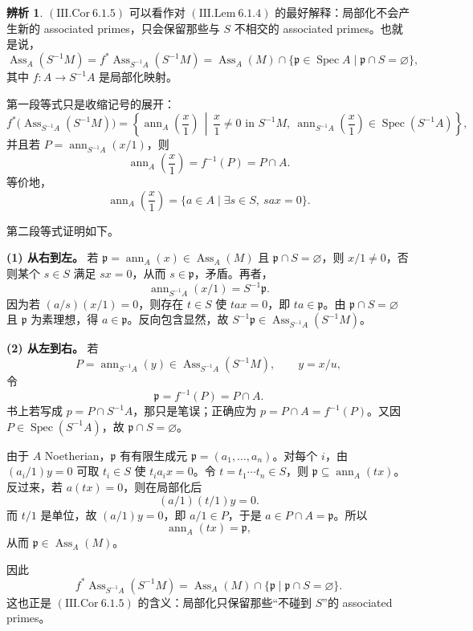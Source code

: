 \documentclass[a4paper]{ctexart}
\theoremstyle{definition}
\theoremstyle{analysis}
\newtheorem{remark}{辨析}[section]
\theoremstyle{plain}
\begin{document}
\begin{remark}
\label{rem:ass-localization-formula}
\((\mathrm{III.Cor}\ 6.1.5)\) 可以看作对 \((\mathrm{III.Lem}\ 6.1.4)\) 的最好解释：局部化不会产生新的 associated primes，只会保留那些与 \(S\) 不相交的 associated primes。也就是说，
\[
  \operatorname{Ass}_A(S^{-1}M)
  =
  f^*\operatorname{Ass}_{S^{-1}A}(S^{-1}M)
  =
  \operatorname{Ass}_A(M)\cap\{\mathfrak p\in \operatorname{Spec}A\mid \mathfrak p\cap S=\varnothing\},
\]
其中 \(f:A\to S^{-1}A\) 是局部化映射。

第一段等式只是收缩记号的展开：
\[
  f^*\bigl(\operatorname{Ass}_{S^{-1}A}(S^{-1}M)\bigr)
  =
  \left\{
    \operatorname{ann}_A\!\left(\frac{x}{1}\right)
    \,\middle|\,
    \frac{x}{1}\neq 0 \text{ in } S^{-1}M,\ 
    \operatorname{ann}_{S^{-1}A}\!\left(\frac{x}{1}\right)\in
    \operatorname{Spec}(S^{-1}A)
  \right\},
\]
并且若 \(P=\operatorname{ann}_{S^{-1}A}(x/1)\)，则
\[
  \operatorname{ann}_A\!\left(\frac{x}{1}\right)=f^{-1}(P)=P\cap A.
\]
等价地，
\[
  \operatorname{ann}_A\!\left(\frac{x}{1}\right)
  =
  \{a\in A\mid \exists s\in S,\ sax=0\}.
\]

第二段等式证明如下。

\textbf{(1) 从右到左。} 若 \(\mathfrak p=\operatorname{ann}_A(x)\in \operatorname{Ass}_A(M)\) 且 \(\mathfrak p\cap S=\varnothing\)，则 \(x/1\neq 0\)，否则某个 \(s\in S\) 满足 \(sx=0\)，从而 \(s\in \mathfrak p\)，矛盾。再者，
\[
  \operatorname{ann}_{S^{-1}A}(x/1)=S^{-1}\mathfrak p.
\]
因为若 \((a/s)(x/1)=0\)，则存在 \(t\in S\) 使 \(tax=0\)，即 \(ta\in \mathfrak p\)。由 \(\mathfrak p\cap S=\varnothing\) 且 \(\mathfrak p\) 为素理想，得 \(a\in \mathfrak p\)。反向包含显然，故 \(S^{-1}\mathfrak p\in \operatorname{Ass}_{S^{-1}A}(S^{-1}M)\)。

\textbf{(2) 从左到右。} 若
\[
  P=\operatorname{ann}_{S^{-1}A}(y)\in \operatorname{Ass}_{S^{-1}A}(S^{-1}M),
  \qquad y=x/u,
\]
令
\[
  \mathfrak p=f^{-1}(P)=P\cap A.
\]
书上若写成 \(p=P\cap S^{-1}A\)，那只是笔误；正确应为 \(p=P\cap A=f^{-1}(P)\)。又因 \(P\in \operatorname{Spec}(S^{-1}A)\)，故 \(\mathfrak p\cap S=\varnothing\)。

由于 \(A\) Noetherian，\(\mathfrak p\) 有有限生成元 \(\mathfrak p=(a_1,\dots,a_n)\)。对每个 \(i\)，由 \((a_i/1)y=0\) 可取 \(t_i\in S\) 使 \(t_i a_i x=0\)。令 \(t=t_1\cdots t_n\in S\)，则 \(\mathfrak p\subseteq \operatorname{ann}_A(tx)\)。反过来，若 \(a(tx)=0\)，则在局部化后
\[
  (a/1)(t/1)y=0.
\]
而 \(t/1\) 是单位，故 \((a/1)y=0\)，即 \(a/1\in P\)，于是 \(a\in P\cap A=\mathfrak p\)。所以
\[
  \operatorname{ann}_A(tx)=\mathfrak p,
\]
从而 \(\mathfrak p\in \operatorname{Ass}_A(M)\)。

因此
\[
  f^*\operatorname{Ass}_{S^{-1}A}(S^{-1}M)
  =
  \operatorname{Ass}_A(M)\cap\{\mathfrak p\mid \mathfrak p\cap S=\varnothing\}.
\]
这也正是 \((\mathrm{III.Cor}\ 6.1.5)\) 的含义：局部化只保留那些“不碰到 \(S\)”的 associated primes。
\end{remark}
\end{document}
